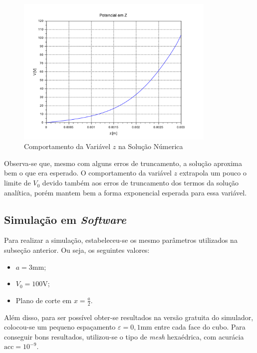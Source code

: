 \documentclass{report}
\begin{document}
\begin{figure}[h!]
  \centering
  \includegraphics[width=0.85\textwidth]{images/plots/numerical_potential_z.pdf}
  \caption{\label{plot:numerical_potential_z} Comportamento da Variável $ z $ na Solução Númerica}
\end{figure}

Observa-se que, mesmo com alguns erros de truncamento, a solução aproxima bem o que era esperado. O comportamento da variável $ z $ extrapola um
pouco o limite de $ V_0 $ devido também aos erros de truncamento dos termos da solução analítica, porém mantem bem a forma exponencial esperada
para essa variável.

\clearpage
\subsection{Simulação em \textit{Software}}
\label{subsec:simul}

Para realizar a simulação, estabeleceu-se os mesmo parâmetros utilizados na subseção anterior. Ou seja, os seguintes valores:

\begin{itemize}
  \item $ a = 3 \text{mm}$;
  \item $ V_0 = 100 \text{V}$;
  \item Plano de corte em $ x = \frac{a}{2} $.
\end{itemize}

Além disso, para ser possível obter-se resultados na versão gratuita do simulador, colocou-se um pequeno espaçamento $ \varepsilon = 0,1\text{mm} $ entre cada face do cubo.
Para conseguir bons resultados, utilizou-se o tipo de \textit{mesh} hexaédrica, com acurácia $ \text{acc} = 10^{-9} $.
\end{document}
